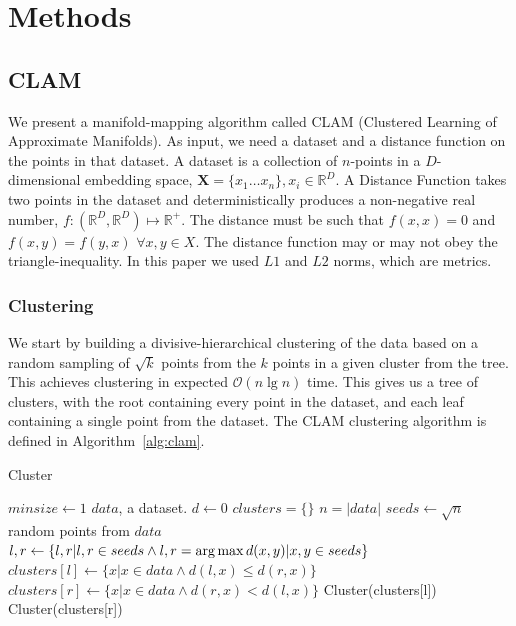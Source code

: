 \section{Methods}
\label{sec:methods}

\subsection{CLAM}
\label{subsec:methods:clam}

We present a manifold-mapping algorithm called CLAM (Clustered Learning of Approximate Manifolds).
As input, we need a dataset and a distance function on the points in that dataset.
A dataset is a collection of $n$-points in a $D$-dimensional embedding space, $\textbf{X} = \{x_1 \dots x_n\}, x_i \in \mathbb{R}^D$.
A Distance Function takes two points in the dataset and deterministically produces a non-negative real number, $f : (\mathbb{R}^D, \mathbb{R}^D) \mapsto \mathbb{R}^+$.
The distance must be such that $f(x, x) = 0$ and $f(x, y) = f(y, x)$ $\forall x, y \in X$.
The distance function may or may not obey the triangle-inequality.
In this paper we used $L1$ and $L2$ norms, which are metrics.

\subsubsection{Clustering}
\label{subsubsec:methods:clam:clustering}

We start by building a divisive-hierarchical clustering of the data based on a random sampling of $\sqrt k$ points from the  $k$ points in a given cluster from the tree.
This achieves clustering in expected $\mathcal{O}(n \lg n)$ time.
This gives us a tree of clusters, with the root containing every point in the dataset, and each leaf containing a single point from the dataset.
The CLAM clustering algorithm is defined in Algorithm~\ref{alg:clam}.

\begin{algorithm} %
\caption{Cluster} %
\label{alg:clam} %
\begin{algorithmic}[1] %
\STATE $minsize \leftarrow 1$
\STATE $data$, a dataset.
\STATE $d \gets 0$
\STATE $clusters = \{\}$
\STATE $n = |data|$
    \STATE $seeds \leftarrow \sqrt{n}$ random points from $data$
    \STATE $l, r \gets \{l, r | l,r \in seeds \land l,r = \operatorname*{arg\,max} d(x,y) | x,y \in seeds\}$
    \STATE $clusters[l] \gets \{x | x \in data \land d(l,x) \le d(r,x)\}$
    \STATE $clusters[r] \gets \{x | x \in data \land d(r,x) < d(l,x)\}$
        \STATE Cluster(clusters[l])
    \ENDIF
        \STATE Cluster(clusters[r])
    \ENDIF
\ENDWHILE
\end{algorithmic}
\end{algorithm}


